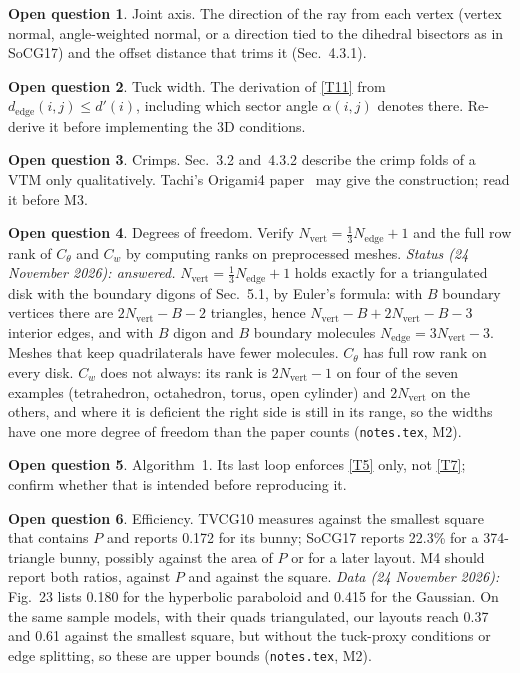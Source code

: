 \documentclass[11pt]{article}
\theoremstyle{definition}
\newtheorem{openq}{Open question}
\newcommand{\VTM}{\mathrm{VTM}}
\newcommand{\Nv}{N_{\mathrm{vert}}}
\newcommand{\Ne}{N_{\mathrm{edge}}}
\begin{document}
\begin{openq}\label{oq:axis}
Joint axis. The direction of the ray from each vertex (vertex normal,
angle-weighted normal, or a direction tied to the dihedral bisectors as in
SoCG17) and the offset distance that trims it (Sec.~4.3.1).
\end{openq}

\begin{openq}\label{oq:t11}
Tuck width. The derivation of \eqref{T11} from $d_{\mathrm{edge}}(i,j) \le
d'(i)$, including which sector angle $\alpha(i,j)$ denotes there. Re-derive it
before implementing the 3D conditions.
\end{openq}

\begin{openq}\label{oq:crimp}
Crimps. Sec.~3.2 and~4.3.2 describe the crimp folds of a $\VTM$ only
qualitatively. Tachi's Origami4 paper~\cite{tachi09} may give the construction;
read it before M3.
\end{openq}

\begin{openq}\label{oq:dof}
Degrees of freedom. Verify $\Nv = \frac13\Ne + 1$ and the full row rank of
$C_\theta$ and $C_w$ by computing ranks on preprocessed meshes.
\emph{Status (24 November 2026): answered.} $\Nv = \frac13\Ne + 1$ holds
exactly for a triangulated disk with the boundary digons of Sec.~5.1, by
Euler's formula: with $B$ boundary vertices there are $2\Nv - B - 2$
triangles, hence $\Nv - B + 2\Nv - B - 3$ interior edges, and with $B$ digon
and $B$ boundary molecules $\Ne = 3\Nv - 3$. Meshes that keep quadrilaterals
have fewer molecules. $C_\theta$ has full row rank on every disk. $C_w$ does
not always: its rank is $2\Nv - 1$ on four of the seven examples (tetrahedron,
octahedron, torus, open cylinder) and $2\Nv$ on the others, and where it is
deficient the right side is still in its range, so the widths have one more
degree of freedom than the paper counts (\texttt{notes.tex}, M2).
\end{openq}

\begin{openq}\label{oq:alg}
Algorithm~1. Its last loop enforces \eqref{T5} only, not \eqref{T7}; confirm
whether that is intended before reproducing it.
\end{openq}

\begin{openq}\label{oq:efficiency}
Efficiency. TVCG10 measures against the smallest square that contains $P$ and
reports 0.172 for its bunny; SoCG17 reports 22.3\% for a 374-triangle bunny,
possibly against the area of $P$ or for a later layout. M4 should report both
ratios, against $P$ and against the square.
\emph{Data (24 November 2026):} Fig.~23 lists 0.180 for the hyperbolic
paraboloid and 0.415 for the Gaussian. On the same sample models, with their
quads triangulated, our layouts reach 0.37 and 0.61 against the smallest
square, but without the tuck-proxy conditions or edge splitting, so these are
upper bounds (\texttt{notes.tex}, M2).
\end{openq}
\end{document}
